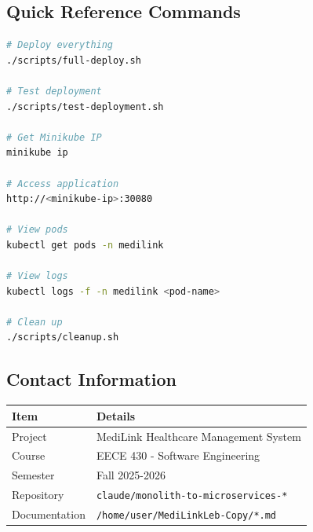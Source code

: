 \documentclass[12pt,a4paper]{article}
\begin{document}
\subsection{Quick Reference Commands}

\begin{lstlisting}[language=bash,caption={Essential Commands}]
# Deploy everything
./scripts/full-deploy.sh

# Test deployment
./scripts/test-deployment.sh

# Get Minikube IP
minikube ip

# Access application
http://<minikube-ip>:30080

# View pods
kubectl get pods -n medilink

# View logs
kubectl logs -f -n medilink <pod-name>

# Clean up
./scripts/cleanup.sh
\end{lstlisting}

\subsection{Contact Information}

\begin{tabular}{@{}ll@{}}
\toprule
\textbf{Item} & \textbf{Details} \\
\midrule
Project & MediLink Healthcare Management System \\
Course & EECE 430 - Software Engineering \\
Semester & Fall 2025-2026 \\
Repository & \texttt{claude/monolith-to-microservices-*} \\
Documentation & \texttt{/home/user/MediLinkLeb-Copy/*.md} \\
\bottomrule
\end{tabular}

\end{document}
